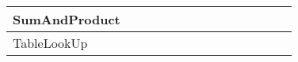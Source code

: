 \begin{center}
\begin{table}
\begin{tabular}{|l|l|l|l|l|l|l|l|l|l|l|l|l|l|}
        \hline
        SumAndProduct      &  &                         &  &                                  &  &                                       &  &                                    &  &                             &  &                                   &                 \\ 
        \hline
        TableLookUp        &  &                         &  &                                  &  &                                       &  &                                    &  &                             &  &                                   &                 \\
        \hline
        \end{tabular}
        \end{table}
\end{center}
